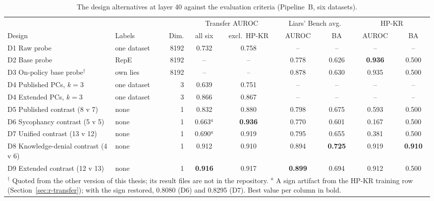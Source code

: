 \begin{table}[t]
\centering
\footnotesize
\caption{The design alternatives at layer 40 against the evaluation criteria (Pipeline~B, six datasets).}
\label{tab:r-designs}
\begin{tabular}{p{39mm}p{16mm}rcccccc}
\hline
 & & & \multicolumn{2}{c}{Transfer AUROC} & \multicolumn{2}{c}{Liars' Bench avg.} & \multicolumn{2}{c}{HP-KR} \\
Design & Labels & Dim. & all six & excl.\ HP-KR & AUROC & BA & AUROC & BA \\
\hline
D1 Raw probe & one dataset & 8192 & 0.732 & 0.758 & -- & -- & -- & -- \\
D2 Base probe & RepE & 8192 & -- & -- & 0.778 & 0.626 & \textbf{0.936} & 0.500 \\
D3 On-policy base probe$^{\dagger}$ & own lies & 8192 & -- & -- & 0.878 & 0.630 & 0.935 & 0.500 \\
D4 Published PCs, $k=3$ & one dataset & 3 & 0.639 & 0.751 & -- & -- & -- & -- \\
D4 Extended PCs, $k=3$ & one dataset & 3 & 0.866 & 0.867 & -- & -- & -- & -- \\
D5 Published contrast (8 v 7) & none & 1 & 0.832 & 0.880 & 0.798 & 0.675 & 0.593 & 0.500 \\
D6 Sycophancy contrast (5 v 5) & none & 1 & 0.663$^{a}$ & \textbf{0.936} & 0.770 & 0.601 & 0.167 & 0.500 \\
D7 Unified contrast (13 v 12) & none & 1 & 0.690$^{a}$ & 0.919 & 0.795 & 0.655 & 0.381 & 0.500 \\
D8 Knowledge-denial contrast (4 v 6) & none & 1 & 0.912 & 0.910 & 0.894 & \textbf{0.725} & 0.919 & \textbf{0.910} \\
D9 Extended contrast (12 v 13) & none & 1 & \textbf{0.916} & 0.917 & \textbf{0.899} & 0.694 & 0.912 & 0.500 \\
\hline
\multicolumn{9}{p{144mm}}{$^{\dagger}$ Quoted from the other version of this thesis; its result files are not in the repository. $^{a}$ A sign artifact from the HP-KR training row (Section~\ref{sec:r-transfer}); with the sign restored, 0.8080 (D6) and 0.8295 (D7). Best value per column in bold.} \\
\end{tabular}
\end{table}
